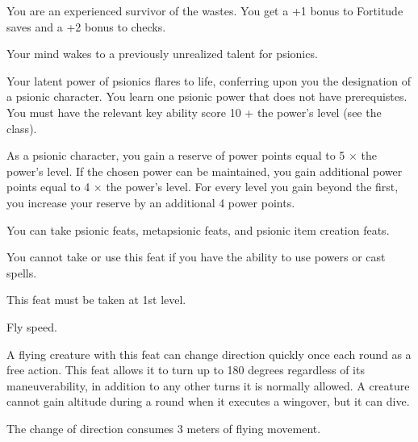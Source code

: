 {You are an experienced survivor of the wastes.}{}
{You get a +1 bonus to Fortitude saves and a +2 bonus to  checks.}{}{}

{Your mind wakes to a previously unrealized talent for psionics.}
{}
{Your latent power of psionics flares to life, conferring upon you the designation of a psionic character. You learn one psionic power that does not have prerequistes. You must have the relevant key ability score 10 + the power's level (see the  class).

As a psionic character, you gain a reserve of power points equal to 5 $\times$ the power's level. If the chosen power can be maintained, you gain additional power points equal to 4 $\times$ the power's level. For every level you gain beyond the first, you increase your reserve by an additional 4 power points.

You can take psionic feats, metapsionic feats, and psionic item creation feats.}
{}
{You cannot take or use this feat if you have the ability to use powers or cast spells.

This feat must be taken at 1st level.}

{Fly speed.}
{A flying creature with this feat can change direction quickly once each round as a free action. This feat allows it to turn up to 180 degrees regardless of its maneuverability, in addition to any other turns it is normally allowed. A creature cannot gain altitude during a round when it executes a wingover, but it can dive.

The change of direction consumes 3 meters of flying movement.}
